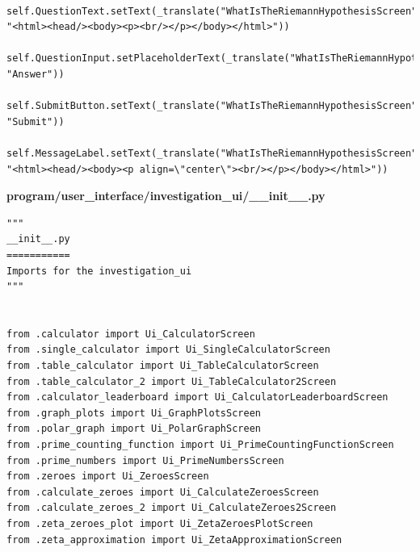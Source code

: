 \documentclass{article}
\begin{document}
\begin{lstlisting}
        self.QuestionText.setText(_translate("WhatIsTheRiemannHypothesisScreen", "<html><head/><body><p><br/></p></body></html>"))
        self.QuestionInput.setPlaceholderText(_translate("WhatIsTheRiemannHypothesisScreen", "Answer"))
        self.SubmitButton.setText(_translate("WhatIsTheRiemannHypothesisScreen", "Submit"))
        self.MessageLabel.setText(_translate("WhatIsTheRiemannHypothesisScreen", "<html><head/><body><p align=\"center\"><br/></p></body></html>"))
\end{lstlisting}


\textbf{program/user\_interface/investigation\_ui/\_\_init\_\_.py}
\begin{lstlisting}
"""
__init__.py
===========
Imports for the investigation_ui
"""


from .calculator import Ui_CalculatorScreen
from .single_calculator import Ui_SingleCalculatorScreen
from .table_calculator import Ui_TableCalculatorScreen
from .table_calculator_2 import Ui_TableCalculator2Screen
from .calculator_leaderboard import Ui_CalculatorLeaderboardScreen
from .graph_plots import Ui_GraphPlotsScreen
from .polar_graph import Ui_PolarGraphScreen
from .prime_counting_function import Ui_PrimeCountingFunctionScreen
from .prime_numbers import Ui_PrimeNumbersScreen
from .zeroes import Ui_ZeroesScreen
from .calculate_zeroes import Ui_CalculateZeroesScreen
from .calculate_zeroes_2 import Ui_CalculateZeroes2Screen
from .zeta_zeroes_plot import Ui_ZetaZeroesPlotScreen
from .zeta_approximation import Ui_ZetaApproximationScreen
\end{lstlisting}
\end{document}
